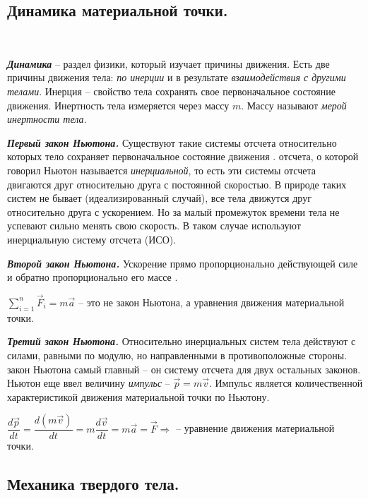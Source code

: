\documentclass[9pt]{article}
\begin{document}
\subsection{Динамика материальной точки.}

\ 
\par\textbf{\textit{Динамика}} -- раздел физики, который изучает причины движения. Есть две причины движения тела: \textit{по инерции} и в результате \textit{взаимодействия с другими телами}. Инерция -- свойство тела сохранять свое первоначальное состояние движения. Инертность тела измеряется через массу \(m\). Массу называют \textit{мерой инертности тела}.
\par\textbf{\textit{Первый закон Ньютона.}} Существуют такие системы отсчета относительно которых тело сохраняет первоначальное состояние движения \boxed{\vec v=\const,\ \vec a = 0}.
\parСистема отсчета, о которой говорил Ньютон называется \textit{инерциальной}, то есть эти системы отсчета двигаются друг относительно друга с постоянной скоростью. В природе таких систем не бывает (идеализированный случай), все тела движутся друг относительно друга с ускорением. Но за малый промежуток времени тела не успевают сильно менять свою скорость. В таком случае используют инерциальную систему отсчета (ИСО).
\par\textbf{\textit{Второй закон Ньютона.}} Ускорение прямо пропорционально действующей силе и обратно пропорционально его массе \boxed{a\sim F,\ a\sim \dfrac{1}{m}}.
\par\(\displaystyle\sum^n_{i=1}\vec F_i=m\vec a\) -- это не закон Ньютона, а уравнения движения материальной точки.
\par\textbf{\textit{Третий закон Ньютона.}} Относительно инерциальных систем тела действуют с силами, равными по модулю, но направленными в противоположные стороны.
\parПервый закон Ньютона самый главный -- он систему отсчета для двух остальных законов.
\parИсаак Ньютон еще ввел величину \textit{импульс} -- \(\vec p=m\vec v\). Импульс является количественной характеристикой движения материальной точки по Ньютону.
\par\(\dfrac{d\vec p}{dt}=\dfrac{d(m\vec v)}{dt}=m\dfrac{d\vec v}{dt}=m\vec a=\vec F\Rightarrow\) \boxed{\dfrac{d\vec p}{dt}=\vec F} -- уравнение движения материальной точки.

\subsection{Механика твердого тела.}
\end{document}
